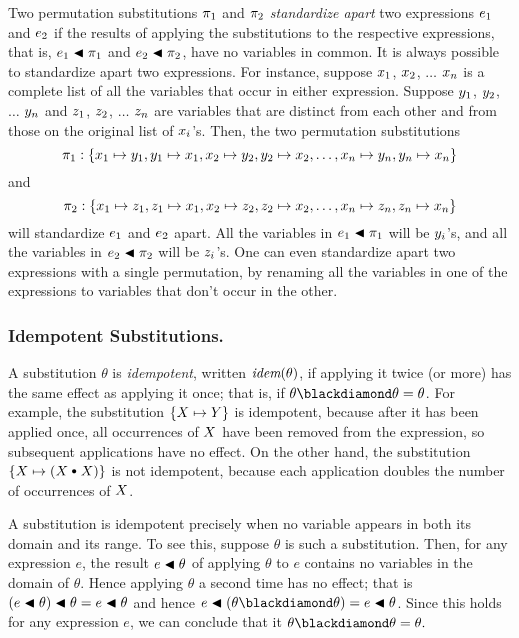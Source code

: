 \documentclass[runningheads]{llncs}
\DeclareMathOperator{\idem}{\emph{idem}}
\begin{document}
 Two permutation substitutions ${\pi}_{1}$ and ${\pi}_{2}$ \emph{standardize apart} two expressions $e_{1}$ and $e_{2}$ if the results of applying the substitutions to the respective expressions, that is, $e_{1}\blacktriangleleft {\pi}_{1}$ and $e_{2} \blacktriangleleft {\pi}_{2}$, have no variables in common.  It is always possible to standardize apart two expressions.  For instance, suppose  ${x}_{1}$, ${x}_{2}$, $\ldots$ ${x}_{n}$ is a complete list of all the variables that occur in either expression.  Suppose ${y}_{1}$, ${y}_{2}$, $\ldots$ ${y}_{n}$ and ${z}_{1}$, ${z}_{2}$, $\dots$ ${z}_{n}$ are variables that are distinct from each other and from those on the original list of ${x}_{i}$'s.  Then, the two permutation substitutions \[{\pi}_{1}: \{{x}_{1} \mapsto {y}_{1}, {y}_{1} \mapsto {x}_{1}, {x}_{2} \mapsto {y}_{2}, {y}_{2} \mapsto {x}_{2}, \ldots, {x}_{n} \mapsto {y}_{n}, {y}_{n} \mapsto {x}_{n}\}\] and \[{\pi}_{2}:\{{x}_{1} \mapsto {z}_{1}, {z}_{1} \mapsto {x}_{1}, {x}_{2} \mapsto {z}_{2}, {z}_{2} \mapsto {x}_{2}, \ldots, {x}_{n} \mapsto {z}_{n}, {z}_{n} \mapsto {x}_{n}\}\]
 will standardize  $e_{1}$ and $e_{2}$ apart.
 All the variables in $e_{1}\blacktriangleleft {\pi}_{1}$ will be ${y}_{i}$'s, and all the variables in $e_{2} \blacktriangleleft {\pi}_{2}$ will be ${z}_{i}$'s. One can even standardize apart two expressions with a single permutation, by renaming all the variables in one of the expressions to variables that don't occur in the other.
 
\subsubsection{Idempotent Substitutions.}  A substitution $\theta$ is \emph{idempotent}, written $\idem(\theta)$, if applying it twice (or more) has the same effect as applying it once;  that is, if $\theta \compose \theta = \theta$.  For example, the substitution $\{X \mapsto Y\}$ is idempotent, because after it has been applied once, all occurrences of $X$ have been removed from the expression, so subsequent applications have no effect.  On the other hand, the substitution $\{\var{X} \mapsto (\var{X} {\cons} \var{X})\}$ is not idempotent, because each application doubles the number of occurrences of $X$.
 
 A substitution is idempotent precisely when no variable appears in both its domain and its range.  To see this, suppose $\theta$ is such a substitution.  Then, for any expression $e$, the result $e \blacktriangleleft \theta$ of applying $\theta$ to $e$ contains no variables in the domain of $\theta$.  Hence applying $\theta$ a second time has no effect; that is $(e \blacktriangleleft \theta) \blacktriangleleft \theta = e \blacktriangleleft \theta$ and hence $e \apply (\theta \compose \theta) = e \apply \theta$. Since this holds for any expression $e$, we can conclude that it $\theta \compose \theta = \theta.$
\end{document}
